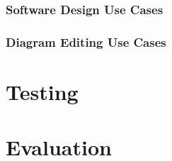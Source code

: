\documentclass[a4paper]{article}
\begin{document}
		\subsubsection{Software Design Use Cases}
		\subsubsection{Diagram Editing Use Cases}
\section{Testing}
\section{Evaluation}
\end{document}
